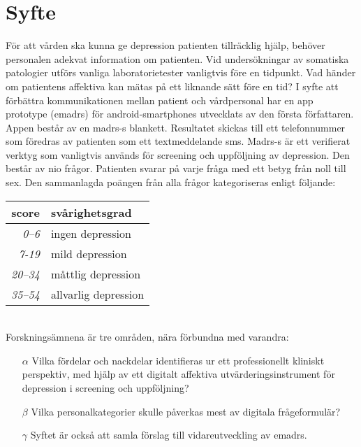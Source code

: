 \documentclass[12pt,a4paper,oneside]{article}
\let\oldcite\cite
\renewcommand*\cite[1]{\textsuperscript{\oldcite{#1}}}
\begin{document}
\section*{Syfte}
F{\"o}r att v{\aa}rden ska kunna ge depression patienten tillr{\"a}cklig hj{\"a}lp, beh{\"o}ver personalen adekvat information om patienten. Vid unders{\"o}kningar av somatiska patologier utf{\"o}rs vanliga laboratorietester vanligtvis f{\"o}re en tidpunkt. Vad h{\"a}nder om patientens affektiva  kan m{\"a}tas p{\aa} ett liknande s{\"a}tt f{\"o}re en tid? I syfte att f{\"o}rb{\"a}ttra kommunikationen mellan patient och v{\aa}rdpersonal har en app prototype (e{\sc madrs}) f{\"o}r android-smartphones utvecklats av den f{\"o}rsta f{\"o}rfattaren\cite {emadrs1, emadrs2}. Appen best{\aa}r av en {\sc madrs-s} blankett. Resultatet skickas till ett telefonnummer som f{\"o}redras av patienten som ett textmeddelande {\sc sms}. {\sc Madrs-s} {\"a}r ett verifierat verktyg som vanligtvis anv{\"a}nds f{\"o}r screening och uppf{\"o}ljning av depression\cite {madrs2, madrs3}. Den best{\aa}r av nio fr{\aa}gor. Patienten svarar p{\aa} varje fr{\aa}ga med ett betyg fr{\aa}n noll till sex. Den sammanlagda po{\"a}ngen fr{\aa}n alla fr{\aa}gor kategoriseras enligt f{\"o}ljande: \\

\begin{tabular}{r|l}
{\bf score} & {\bf sv{\aa}righetsgrad} \\
\hline {\it 0--6} & ingen depression \\
{\it 7-19} & mild depression \\
{\it 20--34} & m{\aa}ttlig depression \\
{\it 35--54} & allvarlig depression \\\end{tabular}\vspace{1em}
\\Forskningsämnena är tre områden, nära förbundna med varandra:
\begin{itemize}
\item[$\alpha$] Vilka f{\"o}rdelar och nackdelar identifieras ur ett professionellt kliniskt perspektiv, med hj{\"a}lp av ett digitalt affektiva  utv{\"a}rderingsinstrument f{\"o}r depression i screening och uppf{\"o}ljning?
\item[$\beta$] Vilka personalkategorier skulle p{\aa}verkas mest av digitala fr{\aa}geformul{\"a}r?
\item[$\gamma$] Syftet {\"a}r ocks{\aa} att samla f{\"o}rslag till vidareutveckling av e{\sc madrs}.
\end{itemize}
\end{document}
